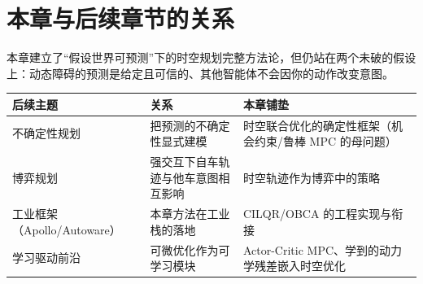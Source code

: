 \section*{本章与后续章节的关系}
本章建立了“假设世界可预测”下的时空规划完整方法论，但仍站在两个未破的假设上：动态障碍的预测是给定且可信的、其他智能体不会因你的动作改变意图。
\begin{table}[H]\centering\small
\begin{tabularx}{\linewidth}{LLL}
\toprule
后续主题 & 关系 & 本章铺垫 \\
\midrule
不确定性规划 & 把预测的不确定性显式建模 & 时空联合优化的确定性框架（机会约束/鲁棒 MPC 的母问题） \\
博弈规划 & 强交互下自车轨迹与他车意图相互影响 & 时空轨迹作为博弈中的策略 \\
工业框架（Apollo/Autoware） & 本章方法在工业栈的落地 & CILQR/OBCA 的工程实现与衔接 \\
学习驱动前沿 & 可微优化作为可学习模块 & Actor-Critic MPC、学到的动力学残差嵌入时空优化 \\
\bottomrule
\end{tabularx}
\end{table}

